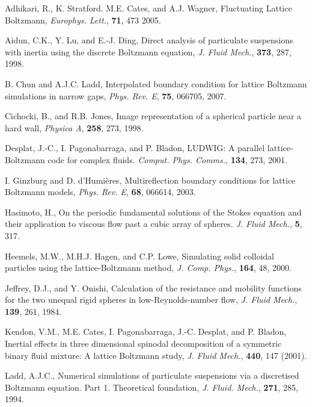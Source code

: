 \begin{thebibliography}{99}

Adhikari, R., K. Stratford. M.E. Cates, and A.J. Wagner,
Fluctuating Lattice Boltzmann,
\textit{Europhys. Lett.}, \textbf{71}, 473 2005.

Aidun, C.K., Y. Lu, and E.-J. Ding,
Direct analysis of particulate suspensions with inertia using the
discrete Boltzmann equation,
\textit{J. Fluid Mech.}, \textbf{373}, 287, 1998.

B. Chun and A.J.C. Ladd,
Interpolated boundary condition for lattice Boltzmann simulations in
narrow gaps,
\textit{Phys. Rev. E}, \textbf{75}, 066705, 2007.

Cichocki, B., and R.B. Jones,
Image representation of a spherical particle near a hard wall,
\textit{Physica A}, \textbf{258}, 273, 1998.

Desplat, J.-C., I. Pagonabarraga, and P. Bladon,
LUDWIG: A parallel lattice-Boltzmann code for complex fluids.
\textit{Comput. Phys. Comms.}, \textbf{134}, 273, 2001.

I. Ginzburg and D. d'Humi\`eres,
Multireflection boundary conditions for lattice Boltzmann models,
\textit{Phys. Rev. E}, \textbf{68}, 066614, 2003.

Hasimoto, H., On the periodic fundamental solutions of the Stokes
equation and their application to viscous flow past a cubic array
of spheres.
\textit{J. Fluid Mech.}, \textbf{5}, 317.

Heemels, M.W., M.H.J. Hagen, and C.P. Lowe, Simulating solid colloidal
particles using the lattice-Boltzmann method,
\textit{J. Comp. Phys.}, \textbf{164}, 48, 2000.

Jeffrey, D.J., and Y. Onishi,
Calculation of the resistance and mobility functions for the two
unequal rigid spheres in low-Reynolds-number flow,
\textit{J. Fluid Mech.}, \textbf{139}, 261, 1984.

Kendon, V.M., M.E. Cates, I. Pagonabarraga, J.-C. Desplat, and
P. Bladon,
Inertial effects in three dimensional spinodal decomposition of
a symmetric binary fluid mixture: A lattice Boltzmann study,
\textit{J. Fluid Mech.}, \textbf{440}, 147 (2001).

Ladd, A.J.C., Numerical simulations of particulate suspensions
via a discretised Boltzmann equation. Part 1. Theoretical foundation,
\textit{J. Fluid. Mech.}, \textbf{271}, 285, 1994.


\end{thebibliography}
